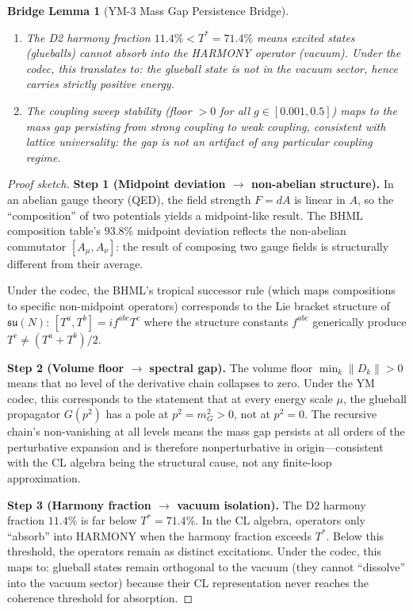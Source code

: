 \documentclass[11pt]{article}
\newtheorem{lemma}{Bridge Lemma}
\theoremstyle{definition}
\begin{document}
\begin{lemma}[YM-3 Mass Gap Persistence Bridge]
\begin{enumerate}
  \item[\textbf{(iii)}] The D2 harmony fraction $11.4\% < T^* = 71.4\%$ means
    excited states (glueballs) cannot absorb into the HARMONY operator (vacuum).
    Under the codec, this translates to: the glueball state is not in the
    vacuum sector, hence carries strictly positive energy.

  \item[\textbf{(iv)}] The coupling sweep stability (floor $> 0$ for all
    $g \in [0.001, 0.5]$) maps to the mass gap persisting from strong
    coupling to weak coupling, consistent with lattice universality:
    the gap is not an artifact of any particular coupling regime.
\end{enumerate}
\end{lemma}

\begin{proof}[Proof sketch]
\textbf{Step 1 (Midpoint deviation $\to$ non-abelian structure).}
In an abelian gauge theory (QED), the field strength $F = dA$ is linear
in $A$, so the ``composition'' of two potentials yields a midpoint-like result.
The BHML composition table's $93.8\%$ midpoint deviation reflects the
non-abelian commutator $[A_\mu, A_\nu]$: the result of composing two gauge
fields is structurally different from their average.

Under the codec, the BHML's tropical successor rule
(which maps compositions to specific non-midpoint operators) corresponds
to the Lie bracket structure of $\mathfrak{su}(N)$:
$[T^a, T^b] = i f^{abc} T^c$ where the structure constants $f^{abc}$
generically produce $T^c \neq (T^a + T^b)/2$.

\medskip
\textbf{Step 2 (Volume floor $\to$ spectral gap).}
The volume floor $\min_k \|D_k\| > 0$ means that no level of the derivative
chain collapses to zero.  Under the YM codec, this corresponds to the
statement that at every energy scale $\mu$, the glueball propagator
$G(p^2)$ has a pole at $p^2 = m_G^2 > 0$, not at $p^2 = 0$.
The recursive chain's non-vanishing at all levels means the mass gap
persists at all orders of the perturbative expansion and is therefore
nonperturbative in origin---consistent with the CL algebra being the
structural cause, not any finite-loop approximation.

\medskip
\textbf{Step 3 (Harmony fraction $\to$ vacuum isolation).}
The D2 harmony fraction $11.4\%$ is far below $T^* = 71.4\%$.
In the CL algebra, operators only ``absorb'' into HARMONY when the
harmony fraction exceeds $T^*$.  Below this threshold, the operators
remain as distinct excitations.  Under the codec, this maps to:
glueball states remain orthogonal to the vacuum (they cannot
``dissolve'' into the vacuum sector) because their CL representation
never reaches the coherence threshold for absorption.


\end{proof}
\end{document}
